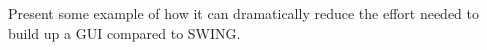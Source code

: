 		Present some example of how it can dramatically reduce the effort needed to build up a GUI compared to SWING.


